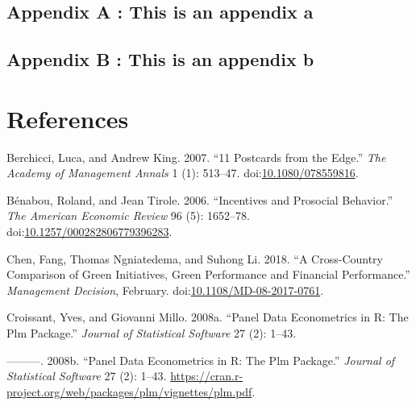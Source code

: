 \documentclass[12pt,]{article}
\begin{document}
\subsection*{Appendix A : This is an appendix
a}\label{appendix-a-this-is-an-appendix-a}

\newpage

\subsection*{Appendix B : This is an appendix
b}\label{appendix-b-this-is-an-appendix-b}

\newpage


\section*{References}\label{references}

\hypertarget{refs}{}
\hypertarget{ref-Berchicci11PostcardsEdge2007}{}
Berchicci, Luca, and Andrew King. 2007. ``11 Postcards from the Edge.''
\emph{The Academy of Management Annals} 1 (1): 513--47.
doi:\href{https://doi.org/10.1080/078559816}{10.1080/078559816}.

\hypertarget{ref-BenabouIncentivesProsocialBehavior2006}{}
Bénabou, Roland, and Jean Tirole. 2006. ``Incentives and Prosocial
Behavior.'' \emph{The American Economic Review} 96 (5): 1652--78.
doi:\href{https://doi.org/10.1257/000282806779396283}{10.1257/000282806779396283}.

\hypertarget{ref-Chencrosscountrycomparisongreen2018}{}
Chen, Fang, Thomas Ngniatedema, and Suhong Li. 2018. ``A Cross-Country
Comparison of Green Initiatives, Green Performance and Financial
Performance.'' \emph{Management Decision}, February.
doi:\href{https://doi.org/10.1108/MD-08-2017-0761}{10.1108/MD-08-2017-0761}.

\hypertarget{ref-Croissant2008a}{}
Croissant, Yves, and Giovanni Millo. 2008a. ``Panel Data Econometrics in
R: The Plm Package.'' \emph{Journal of Statistical Software} 27 (2):
1--43.

\hypertarget{ref-Croissant2008}{}
---------. 2008b. ``Panel Data Econometrics in R: The Plm Package.''
\emph{Journal of Statistical Software} 27 (2): 1--43.
\url{https://cran.r-project.org/web/packages/plm/vignettes/plm.pdf}.
\end{document}
